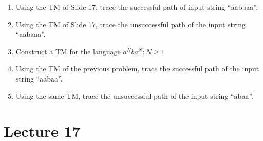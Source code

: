 \documentclass[letterpaper, 12 pt]{article}
\begin{document}
\begin{enumerate}

    \item Using the TM of Slide 17, trace the successful path of input string
        ``aabbaa''.

    \item Using the TM of Slide 17, trace the unsuccessful path of the input
        string ``aabaaa''.

    \item Construct a TM for the language $a^N b a^N: N \geq 1$

    \item Using the TM of the previous problem, trace the successful path of the
        input string ``aabaa''.

    \item Using the same TM, trace the unsuccessful path of the input string ``abaa''.

\end{enumerate}

\section{Lecture 17}
\end{document}

